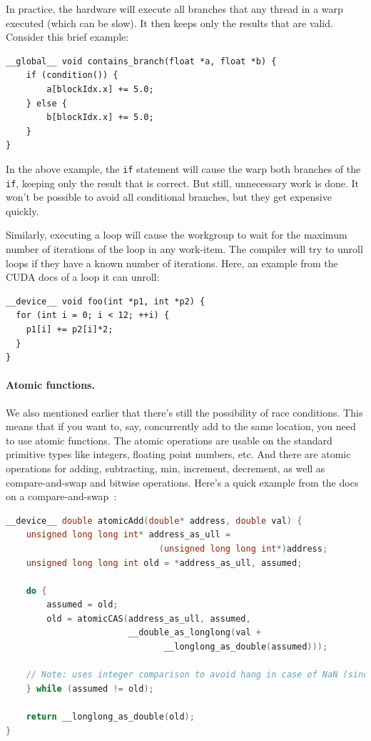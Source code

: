 \documentclass[a4paper]{report}
\begin{document}
In practice, the hardware will execute all branches that any thread in
a warp executed (which can be slow). It then keeps only the results that are valid. Consider this brief example:

    \begin{verbatim}
__global__ void contains_branch(float *a, float *b) {
    if (condition()) {
        a[blockIdx.x] += 5.0;
    } else {
        b[blockIdx.x] += 5.0;
    }
}
\end{verbatim}

In the above example, the {\tt if} statement will cause
the warp both branches of the {\tt if}, keeping only the
result that is correct. But still, unnecessary work is done. It won't be possible to avoid all conditional branches, but they get expensive quickly.

Similarly, executing a loop will cause the
workgroup to wait for the maximum number of iterations of the loop in
any work-item. The compiler will try to unroll loops if they have a known number of iterations. Here, an example from the CUDA docs of a loop it can unroll:

{\scriptsize \hspace*{2em} \begin{minipage}{.5\textwidth}
    \begin{lstlisting}
__device__ void foo(int *p1, int *p2) {
  for (int i = 0; i < 12; ++i) {
    p1[i] += p2[i]*2;
  }
}
    \end{lstlisting}
\end{minipage} }

\paragraph{Atomic functions.}

We also mentioned earlier that there's still the possibility of race conditions. This means that if you want to, say, concurrently add to the same location, you need to use atomic functions. The atomic operations are usable on the standard primitive types like integers, floating point numbers, etc. And there are atomic operations for adding, subtracting, min, increment, decrement, as well as compare-and-swap and bitwise operations. Here's a quick example from the docs on a compare-and-swap~\cite{cuda}:

\begin{lstlisting}[language=C++]
__device__ double atomicAdd(double* address, double val) {
    unsigned long long int* address_as_ull =
                              (unsigned long long int*)address;
    unsigned long long int old = *address_as_ull, assumed;

    do {
        assumed = old;
        old = atomicCAS(address_as_ull, assumed,
                        __double_as_longlong(val +
                               __longlong_as_double(assumed)));

    // Note: uses integer comparison to avoid hang in case of NaN (since NaN != NaN)
    } while (assumed != old);

    return __longlong_as_double(old);
}
\end{lstlisting}
\end{document}
